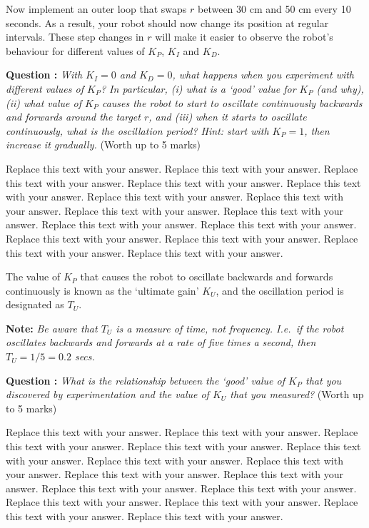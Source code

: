 \documentclass[hidelinks,a4paper,11pt]{article}
\newcounter{question}
\newcommand\myq{\refstepcounter{question}\thequestion}
\begin{document}
Now implement an outer loop that swaps $r$ between 30 cm and 50 cm every 10 seconds.  As a result, your robot should now change its position at regular intervals.  These step changes in $r$ will make it easier to observe the robot's behaviour for different values of $K_P$, $K_I$ and $K_D$.

{\bfseries Question \myq:}  \emph{With $K_I=0$ and $K_D=0$, what happens when you experiment with different values of $K_P$?  In particular, (i) what is a `good' value for $K_P$ (and why), (ii) what value of $K_P$ causes the robot to start to oscillate continuously backwards and forwards around the target $r$, and (iii) when it starts to oscillate continuously, what is the oscillation period?  Hint: start with $K_P =1$, then increase it gradually.} (Worth up to 5 marks)\\
\begin{mdframed}
Replace this text with your answer.  Replace this text with your answer.  Replace this text with your answer.  Replace this text with your answer.  Replace this text with your answer.  Replace this text with your answer.  Replace this text with your answer.  Replace this text with your answer.  Replace this text with your answer.  Replace this text with your answer.  Replace this text with your answer.  Replace this text with your answer.  Replace this text with your answer.  Replace this text with your answer.  Replace this text with your answer.
\end{mdframed}
\vspace*{\baselineskip}

The value of $K_P$ that causes the robot to oscillate backwards and forwards continuously is known as the `ultimate gain' $K_U$, and the oscillation period is designated as $T_U$.

{\bfseries Note:}  \emph{Be aware that $T_U$ is a measure of time, not frequency.  I.e.\ if the robot oscillates backwards and forwards at a rate of five times a second, then $T_U=1/5=0.2$ secs.}

{\bfseries Question \myq:}  \emph{What is the relationship between the `good' value of $K_P$ that you discovered by experimentation and the value of $K_U$ that you measured?} (Worth up to 5 marks)\\
\begin{mdframed}
Replace this text with your answer.  Replace this text with your answer.  Replace this text with your answer.  Replace this text with your answer.  Replace this text with your answer.  Replace this text with your answer.  Replace this text with your answer.  Replace this text with your answer.  Replace this text with your answer.  Replace this text with your answer.  Replace this text with your answer.  Replace this text with your answer.  Replace this text with your answer.  Replace this text with your answer.  Replace this text with your answer.
\end{mdframed}
\vspace*{\baselineskip}
\end{document}
